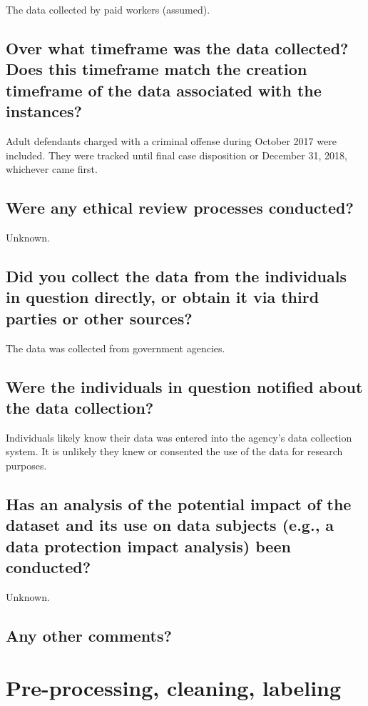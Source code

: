 \documentclass[letterpaper, 10 pt, conference]{ieeeconf}  %
\begin{document}
The data collected by paid workers (assumed).

\subsection{Over what timeframe was the data collected? Does this timeframe match the creation timeframe of the data associated with the instances?}

Adult defendants charged with a criminal offense during October 2017 were included. They were tracked until final case disposition or December 31, 2018, whichever came first.

\subsection{Were any ethical review processes conducted?}

Unknown.

\subsection{Did you collect the data from the individuals in question directly, or obtain it via third parties or other sources?}

The data was collected from government agencies. 

\subsection{Were the individuals in question notified about the data collection?}

Individuals likely know their data was entered into the agency's data collection system. It is unlikely they knew or consented the use of the data for research purposes.


\subsection{Has an analysis of the potential impact of the dataset and its use on data subjects (e.g., a data protection impact analysis) been conducted?}

Unknown.

\subsection{Any other comments?}
\lipsum[1]

\section{Pre-processing, cleaning, labeling}
\end{document}
